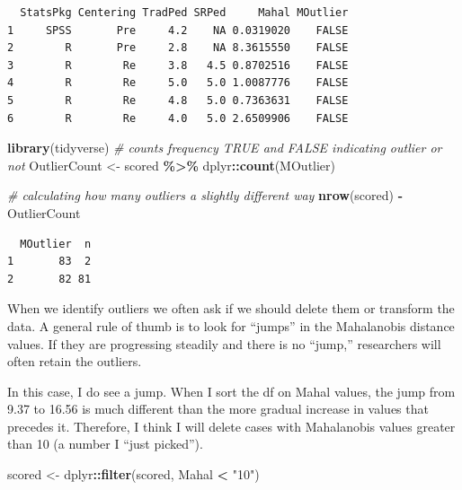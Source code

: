 \documentclass[
  11pt,
]{book}
\newenvironment{Shaded}{\begin{snugshade}}{\end{snugshade}}
\newcommand{\CommentTok}[1]{\textcolor[rgb]{0.37,0.37,0.37}{\textit{#1}}}
\newcommand{\FunctionTok}[1]{\textcolor[rgb]{0.27,0.27,0.27}{\textbf{#1}}}
\newcommand{\NormalTok}[1]{#1}
\newcommand{\OtherTok}[1]{\textcolor[rgb]{0.37,0.37,0.37}{#1}}
\newcommand{\SpecialCharTok}[1]{\textcolor[rgb]{0.43,0.43,0.43}{\textbf{#1}}}
\newcommand{\StringTok}[1]{\textcolor[rgb]{0.5,0.5,0.5}{#1}}
\begin{document}
\begin{verbatim}
  StatsPkg Centering TradPed SRPed     Mahal MOutlier
1     SPSS       Pre     4.2    NA 0.0319020    FALSE
2        R       Pre     2.8    NA 8.3615550    FALSE
3        R        Re     3.8   4.5 0.8702516    FALSE
4        R        Re     5.0   5.0 1.0087776    FALSE
5        R        Re     4.8   5.0 0.7363631    FALSE
6        R        Re     4.0   5.0 2.6509906    FALSE
\end{verbatim}

\begin{Shaded}
\begin{Highlighting}[]
\FunctionTok{library}\NormalTok{(tidyverse)}
\CommentTok{\# counts frequency TRUE and FALSE indicating outlier or not}
\NormalTok{OutlierCount }\OtherTok{\textless{}{-}}\NormalTok{ scored }\SpecialCharTok{\%\textgreater{}\%}
\NormalTok{    dplyr}\SpecialCharTok{::}\FunctionTok{count}\NormalTok{(MOutlier)}

\CommentTok{\# calculating how many outliers a slightly different way}
\FunctionTok{nrow}\NormalTok{(scored) }\SpecialCharTok{{-}}\NormalTok{ OutlierCount}
\end{Highlighting}
\end{Shaded}

\begin{verbatim}
  MOutlier  n
1       83  2
2       82 81
\end{verbatim}

When we identify outliers we often ask if we should delete them or transform the data. A general rule of thumb is to look for ``jumps'' in the Mahalanobis distance values. If they are progressing steadily and there is no ``jump,'' researchers will often retain the outliers.

In this case, I do see a jump. When I sort the df on Mahal values, the jump from 9.37 to 16.56 is much different than the more gradual increase in values that precedes it. Therefore, I think I will delete cases with Mahalanobis values greater than 10 (a number I ``just picked'').

\begin{Shaded}
\begin{Highlighting}[]
\NormalTok{scored }\OtherTok{\textless{}{-}}\NormalTok{ dplyr}\SpecialCharTok{::}\FunctionTok{filter}\NormalTok{(scored, Mahal }\SpecialCharTok{\textless{}} \StringTok{"10"}\NormalTok{)}
\end{Highlighting}
\end{Shaded}
\end{document}
